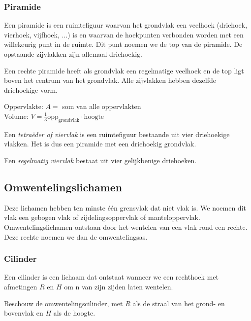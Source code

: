 \subsubsection{Piramide}
\begin{definitie}
	Een piramide is een ruimtefiguur waarvan het grondvlak een veelhoek (driehoek, vierhoek, vijfhoek, $\ldots$) is en waarvan de hoekpunten verbonden worden met een willekeurig punt in de ruimte. Dit punt noemen we de top van de piramide. De opstaande zijvlakken zijn allemaal driehoekig. 

\end{definitie}
Een rechte piramide heeft als grondvlak een regelmatige veelhoek en de top ligt boven het centrum van het grondvlak. Alle zijvlakken hebben dezelfde driehoekige vorm.

%



\begin{ftonthoud}
	Oppervlakte: $A=$ som van alle oppervlakten
\\
Volume: $V=\frac{1}{3}\text{opp}_{\text{grondvlak}}\cdot \text{hoogte}$
\end{ftonthoud}

\begin{definitie}
	Een \emph{tetra\"eder of viervlak} is een ruimtefiguur bestaande uit vier driehoekige vlakken. Het is dus een piramide met een driehoekig grondvlak.

Een \emph{regelmatig viervlak} bestaat uit vier gelijkbenige driehoeken.

\end{definitie}

\subsection{Omwentelingslichamen}

Deze lichamen hebben ten minste \'e\'en grensvlak dat niet vlak is. We noemen dit vlak een gebogen vlak of zijdelingsoppervlak of manteloppervlak. Omwentelingslichamen ontstaan door het wentelen van een vlak rond een rechte. Deze rechte noemen we dan de omwentelingsas.

\subsubsection{Cilinder}
\begin{definitie}
	Een cilinder is een lichaam dat ontstaat wanneer we een rechthoek met afmetingen  $R$ en $H$ om n van zijn zijden laten wentelen.
\end{definitie}
 Beschouw de omwentelingscilinder, met $R$ als de straal van het grond- en bovenvlak en $H$ als de hoogte.


